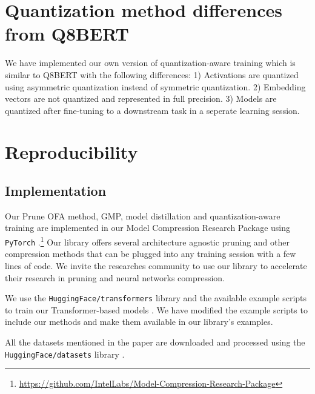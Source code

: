 \documentclass{article}
\begin{document}
\section{Quantization method differences from Q8BERT}
\label{app:quantization}
We have implemented our own version of quantization-aware training which is similar to Q8BERT with the following differences:
1) Activations are quantized using asymmetric quantization instead of symmetric quantization.
2) Embedding vectors are not quantized and represented in full precision.
3) Models are quantized after fine-tuning to a downstream task in a seperate learning session.

\section{Reproducibility}
\label{app:reproduce}
\subsection{Implementation}
Our Prune OFA method, GMP, model distillation and quantization-aware training are implemented in our Model Compression Research Package using \texttt{PyTorch} \citep{paszke2019pytorch}.\footnote{\url{https://github.com/IntelLabs/Model-Compression-Research-Package}}
Our library offers several architecture agnostic pruning and other compression methods that can be plugged into any training session with a few lines of code.
We invite the researches community to use our library to accelerate their research in pruning and neural networks compression.

We use the \texttt{HuggingFace/transformers} library and the available example scripts to train our Transformer-based models \citep{wolf-etal-2020-transformers}.
We have modified the example scripts to include our methods and make them available in our library's examples.

All the datasets mentioned in the paper are downloaded and processed using the \texttt{HuggingFace/datasets} library \citep{quentin-lhoest-datasets}.
\end{document}
